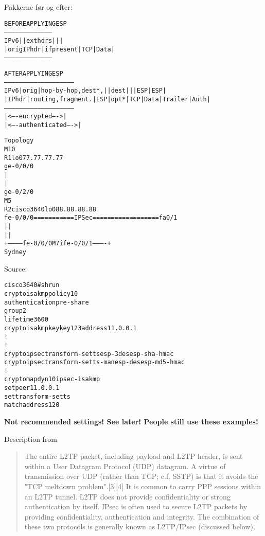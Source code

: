 \documentclass[Screen16to9,17pt]{foils}
\begin{document}
Pakkerne før og efter:
\begin{alltt}\small
               BEFORE APPLYING ESP
         ---------------------------------------
   IPv6  |             | ext hdrs |     |      |
         | orig IP hdr |if present| TCP | Data |
         ---------------------------------------



               AFTER APPLYING ESP
         ---------------------------------------------------------
   IPv6  | orig |hop-by-hop,dest*,|   |dest|   |    | ESP   | ESP|
         |IP hdr|routing,fragment.|ESP|opt*|TCP|Data|Trailer|Auth|
         ---------------------------------------------------------
                                   |<---- encrypted ---->|
                               |<---- authenticated ---->|
\end{alltt}





\begin{alltt}\small
Topology
  M10
  R1      lo0 77.77.77.77
ge-0/0/0
   |
   |
ge-0/2/0
  M5
  R2                                         cisco3640  lo0 88.88.88.88
fe-0/0/0  ===========IPSec==================    fa0/1
   |                                              |
   |                                              |
   +----------- fe-0/0/0  M7i  fe-0/0/1 ----------+
                        Sydney
\end{alltt}

Source:


\begin{alltt}\small
cisco3640#sh run
crypto isakmp policy 10
 authentication pre-share
 group 2
 lifetime 3600
crypto isakmp key key123 address 11.0.0.1
!
!
crypto ipsec transform-set ts esp-3des esp-sha-hmac
crypto ipsec transform-set ts-man esp-des esp-md5-hmac
!
crypto map dyn 10 ipsec-isakmp
 set peer 11.0.0.1
 set transform-set ts
 match address 120
\end{alltt}

\vskip 1cm
\centerline{\bf Not recommended settings! See later! People still use these examples!}



Description from
\begin{quote}\small
The entire L2TP packet, including payload and L2TP header, is sent within a User Datagram Protocol (UDP) datagram. A virtue of transmission over UDP (rather than TCP; c.f. SSTP) is that it avoids the "TCP meltdown problem".[3][4] It is common to carry PPP sessions within an L2TP tunnel. L2TP does not provide confidentiality or strong authentication by itself. IPsec is often used to secure L2TP packets by providing confidentiality, authentication and integrity. The combination of these two protocols is generally known as L2TP/IPsec (discussed below).
\end{quote}
\end{document}
